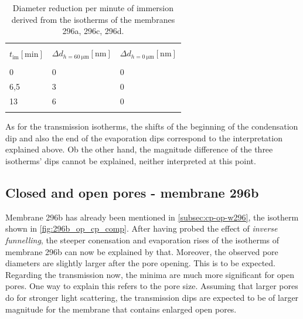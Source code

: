\documentclass[thesis.tex]{subfiles}
\begin{document}
          \begin{table}
            \caption{Diameter reduction per minute of immersion derived from the isotherms of the membranes 296a, 296c, 296d.}
            \label{tbl:etch_rate}
            \begin{tabu} {X[r]X[r]X[r]}
              \unitoprule \\
              \textbf{$t_\mathrm{im} [\si{\minute}]$} & \textbf{$\Delta d_{h=\SI{60}{\micro\meter}} [\si{\nano\meter}]$} & \textbf{$\Delta d_{h=\SI{0}{\micro\meter}} [\si{\nano\meter}]$} \\
              \unimidrule \\
              0 &0  &0 \\
              6,5 &3  &0  \\
              13  &6  &0  \\
              \unitoprule \\
            \end{tabu}
          \end{table}

          As for the transmission isotherms, the shifts of the beginning of the condensation dip and also the end of the evaporation dips correspond to the interpretation explained above. Ob the other hand, the magnitude difference of the three isotherms' dips cannot be explained, neither interpreted at this point.

          


        \subsection{Closed and open pores - membrane 296b}
        \label{subsec:closed-open-pores-296b}

          Membrane 296b has already been mentioned in \cref{subsec:cp-op-w296}, the isotherm shown in \cref{fig:296b_op_cp_comp}. After having probed the effect of \textit{inverse funnelling}, the steeper conensation and evaporation rises of the isotherms of membrane 296b can now be explained by that. Moreover, the observed pore diameters are slightly larger after the pore opening. This is to be expected. Regarding the transmission now, the minima are much more significant for open pores. One way to explain this refers to the pore size. Assuming that larger pores do for stronger light scattering, the transmission dips are expected to be of larger magnitude for the membrane that contains enlarged open pores.
\end{document}
